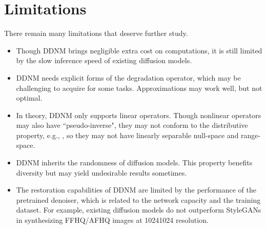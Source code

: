 \documentclass{article} \usepackage{iclr2023_conference,times}
\begin{document}
\section{Limitations}
\label{cp: limitations}
There remain many limitations that deserve further study. 
\begin{itemize}
    \item Though DDNM brings negligible extra cost on computations, it is still limited by the slow inference speed of existing diffusion models. 

    \item DDNM needs explicit forms of the degradation operator, which may be challenging to acquire for some tasks. Approximations may work well, but not optimal. 

    \item In theory, DDNM only supports linear operators. Though nonlinear operators may also have ``pseudo-inverse", they may not conform to the distributive property, e.g., , so they may not have linearly separable null-space and range-space. 

    \item DDNM inherits the randomness of diffusion models. This property benefits diversity but may yield undesirable results sometimes. 

    \item The restoration capabilities of DDNM are limited by the performance of the pretrained denoiser, which is related to the network capacity and the training dataset. For example, existing diffusion models do not outperform StyleGANs \citep{stylegan,stylegan2,stylegan3} in synthesizing FFHQ/AFHQ images at 10241024 resolution.

\end{itemize}
\end{document}
